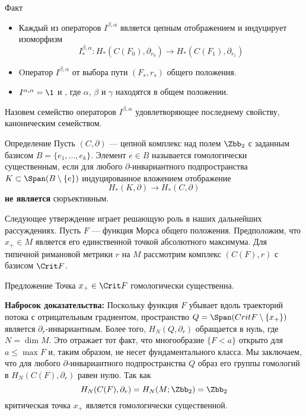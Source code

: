 \begin{thm}{Факт}\label{13.2.E}
  \begin{itemize}
  \item
    Каждый из операторов $I^{\beta,\alpha}$ является цепным
    отображением и индуцирует изоморфизм
    \[
    I^{\beta,\alpha}_{*} :
    H_{*}(C(F_{0}),\partial_{r_{0}}) \to
    H_{*}(C(F_{1}),\partial_{r_{1}})
    \]
  \item
    Oператор $I^{\beta,\alpha}$ 
    от выбора пути $(F_{s},r_{s})$ общего положения.
  \item
    $I^{\alpha,\alpha}=\1$ и , где $\alpha$, $\beta$ и
    $\gamma$ находятся в общем положении.
  \end{itemize}
\end{thm}

Назовем семейство операторов $I^{\beta,\alpha}$ удовлетворяющее
последнему свойству, каноническим семейством. 

\begin{ex}{Определение}\label{13.2.F}
  Пусть $(C, \partial)$ --- цепной комплекс над полем $\Zbb_{2}$
  с заданным базисом $B = \{e_{1},...,e_{k}\}$.
  Элемент $e\in B$ называется гомологически существенным, если для
  любого $\partial$-инвариантного подпространства
  $K\subset \Span(B\setminus \{e\})$ индуцированное вложением отображение
  \[
  H_{*}(K,\partial)\to H_{*}(C,\partial)
  \]
  \textbf{не является} сюръективным.
\end{ex}

Следующее утверждение играет решающую роль в наших дальнейших рассуждениях.
Пусть $F$ — функция Морса общего положения.
Предположим, что $x_{+}\in M$ является его единственной точкой
абсолютного максимума. 
Для типичной римановой метрики $r$ на $M$ рассмотрим комплекс
$(C(F),r)$ с базисом $\Crit F$. 

\begin{thm}{Предложение}\label{13.2.G}
  Точка $x_{+}\in\Crit F$ гомологически существенна.  
\end{thm}

\noindent\textbf{Набросок доказательства:} Поскольку функция $F$
убывает вдоль траекторий потока с отрицательным градиентом,
пространство
$Q = \Span( Crit F \setminus \{x_{+}\})$ является $\partial_{r}$-инвариантным.
Более того, $H_{N}(Q,\partial_{r})$ обращается в нуль, где $N = \dim M$.
Это отражает тот факт, что многообразие $\{F<a\}$ открыто для $a\leq
\max F$ и, таким образом, не несет фундаментального класса. 
Мы заключаем, что для любого $\partial$-инвариантного подпространства
$Q$ образ его группы гомологий в $H_{N}(C(F),\partial_{r})$ равен
нулю. Так как
\[
H_{N}(C(F),\partial_{r})=H_{N}(M;\Zbb_{2})=\Zbb_{2}
\]
критическая точка $x_{+}$ является гомологически существенной.
\qeds

